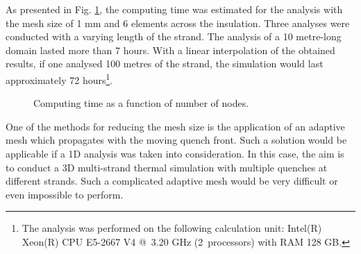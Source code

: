 As presented in Fig. \ref{fig: quench_propagation_conclusion_computing_time_estimation}, the computing time was estimated for the analysis with the mesh size of 1 mm and 6 elements across the insulation. Three analyses were conducted with a varying length of the strand. The analysis of a 10 metre-long domain lasted more than 7 hours. With a linear interpolation of the obtained results, if one analysed 100 metres of the strand, the simulation would last approximately 72 hours\footnote{The analysis was performed on the following calculation unit: Intel(R) Xeon(R) CPU E5-2667 V4 @~3.20 GHz (2~processors) with RAM 128 GB.}.

\begin{figure}[H]
\centering
    \caption{Computing time as a function of number of nodes.}
    \label{fig: quench_propagation_conclusion_computing_time_estimation}
\end{figure}

One of the methods for reducing the mesh size is the application of an adaptive mesh which propagates with the moving quench front. Such a solution would be applicable if a 1D analysis was taken into consideration. In this case, the aim is to conduct a 3D multi-strand thermal simulation with multiple quenches at different strands. Such a complicated adaptive mesh would be very difficult or even impossible to perform.


